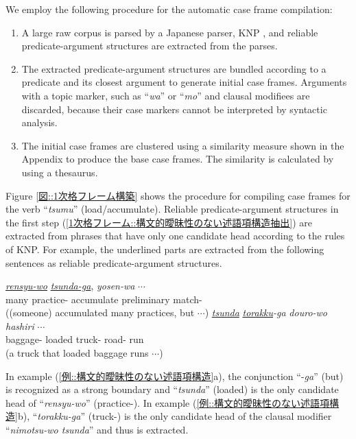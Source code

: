 \documentclass[english]{jnlp_1.4_rep}
\newcommand{\nom}{}
\newcommand{\acc}{}
\newcommand{\TOP}{}
\begin{document}
We employ the following procedure for the automatic case frame compilation:
\begin{enumerate}
 \item A large raw corpus is parsed by a Japanese parser, KNP \cite{Kurohashi1994}, and reliable
       predicate-argument structures are extracted from the parses.
       \label{1次格フレーム::構文的曖昧性のない述語項構造抽出}
 \item The extracted predicate-argument structures are bundled according
       to a predicate and its closest argument to generate initial case
       frames. Arguments with a topic marker, such as ``\textit{wa}'' or ``\textit{mo}'' and
       clausal modifiees are discarded, because their case markers
       cannot be interpreted by syntactic analysis.
       \label{1次格フレーム::用言とその直前の格要素でまとめる}
 \item The initial case frames are clustered using a similarity
       measure shown in the Appendix to produce the base case frames. The similarity is
       calculated by using a thesaurus.
\end{enumerate}
Figure \ref{図::1次格フレーム構築} shows the procedure for compiling case
frames for the verb ``\textit{tsumu}'' (load/accumulate). Reliable
predicate-argument structures in the first step (\ref{1次格フレーム::構文的曖昧性のない述語項構造抽出}) are extracted from phrases that have only
one candidate head according to the rules of KNP.
For example, the underlined parts are extracted from the following sentences as reliable predicate-argument structures.
\begin{exe}
\ex \label{例::構文的曖昧性のない述語項構造}
 \begin{xlist}
 \ex
   {\textit{\underline{rensyu-wo}}} {\textit{\underline{tsunda-ga}},} {\textit{yosen-wa}} $\cdots$ \\
       {many} {practice-\acc} {accumulate} {preliminary match-\TOP} \\
  \trans ((someone) accumulated many practices, but $\cdots$)
 \ex
   {\textit{\underline{tsunda}}} {\textit{\underline{torakku}-ga}} {\textit{douro-wo}} {\textit{hashiri}} $\cdots$ \\
       {baggage-\acc} {loaded} {truck-\nom} {road-\acc} {run} \\
  \trans (a truck that loaded baggage runs $\cdots$)
 \end{xlist}
\end{exe}
In example (\ref{例::構文的曖昧性のない述語項構造}a), the conjunction ``-\textit{ga}'' (but) is
recognized as a strong boundary and ``\textit{tsunda}'' (loaded) is the only candidate
head of ``\textit{rensyu-wo}'' (practice-\acc).
In example (\ref{例::構文的曖昧性のない述語項構造}b),
``\textit{torakku-ga}'' (truck-\nom) is the only candidate head of the
clausal modifier ``\textit{nimotsu-wo tsunda}'' and thus is extracted.
\end{document}
